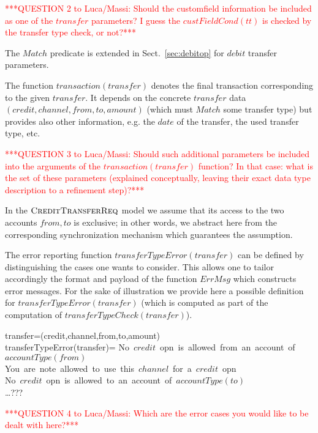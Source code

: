 \vspace{12pt}
\textcolor{red}{***QUESTION 2 to Luca/Massi: Should the customfield information be included as one of the $transfer$ parameters? I guess the $custFieldCond(tt)$ is checked by the transfer type check, or not?***}
\vspace{12pt}

The $Match$ predicate is extended in Sect.~\ref{sec:debitop} for $debit$ transfer parameters.

The function $transaction(transfer)$ denotes the final transaction corresponding to the given $transfer$. It depends on the concrete $transfer$ data $(credit,channel,from,to,amount)$ (which must $Match$ some transfer type) but provides also other information, e.g. the $date$ of the transfer, the used transfer type, etc.

\vspace{12pt}
\textcolor{red}{***QUESTION 3 to Luca/Massi: Should such additional parameters be included
	into the arguments of the $transaction(transfer)$ function? In that case: what is the set of these parameters (explained conceptually, leaving their exact data type description to a refinement step)?***}
\vspace{12pt}

In the $\hbox{\sc CreditTransferReq}$ model we assume that its access to the two accounts $from, to$ is exclusive; in other words, we abstract here from the corresponding synchronization mechanism which guarantees the assumption.

The error reporting function $transferTypeError(transfer)$ can be defined by distinguishing the cases one wants to consider. This allows one to tailor accordingly the format and payload of the function  $ErrMsg$ which constructs error messages. For the sake of illustration we provide here a possible definition for  $transferTypeError(transfer)$ (which is computed as part of the computation of $transferTypeCheck(transfer)$).

\begin{asm}
\LET transfer=(credit,channel,from,to,amount) \\
transferTypeError(transfer)=\+
  \mbox{No $credit$ opn is allowed from an account of $accountType(from)$}\\ 
  \OR \mbox{You are note allowed to use this $channel$ for a $credit$ opn}\\
  \OR \mbox{No $credit$ opn is allowed to an account of $accountType(to)$}\\
    \OR \ldots ???
\end{asm}
\vspace{12pt}
\textcolor{red}{***QUESTION 4 to Luca/Massi: Which are the error cases you would like to be dealt with here?***}
\vspace{12pt}


